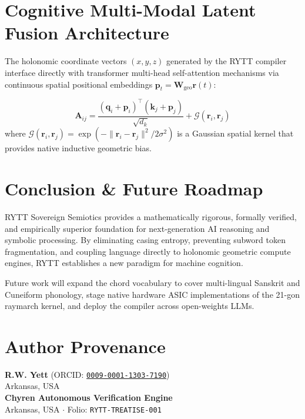 \documentclass[11pt,oneside,letterpaper]{article}
\theoremstyle{definition}
\begin{document}
\section{Cognitive Multi-Modal Latent Fusion Architecture}

The holonomic coordinate vectors $(x, y, z)$ generated by the RYTT compiler interface directly with transformer multi-head self-attention mechanisms via continuous spatial positional embeddings $\mathbf{p}_t = \mathbf{W}_{\text{geo}} \mathbf{r}(t)$:

\begin{equation}
\mathbf{A}_{ij} = \frac{(\mathbf{q}_i + \mathbf{p}_i)^\top (\mathbf{k}_j + \mathbf{p}_j)}{\sqrt{d_k}} + \mathcal{G}(\mathbf{r}_i, \mathbf{r}_j)
\end{equation}
where $\mathcal{G}(\mathbf{r}_i, \mathbf{r}_j) = \exp(-\|\mathbf{r}_i - \mathbf{r}_j\|^2 / 2\sigma^2)$ is a Gaussian spatial kernel that provides native inductive geometric bias.

\section{Conclusion \& Future Roadmap}

RYTT Sovereign Semiotics provides a mathematically rigorous, formally verified, and empirically superior foundation for next-generation AI reasoning and symbolic processing. By eliminating casing entropy, preventing subword token fragmentation, and coupling language directly to holonomic geometric compute engines, RYTT establishes a new paradigm for machine cognition.

Future work will expand the chord vocabulary to cover multi-lingual Sanskrit and Cuneiform phonology, stage native hardware ASIC implementations of the 21-gon raymarch kernel, and deploy the compiler across open-weights LLMs.

\section*{Author Provenance}
\noindent\textbf{R.W. Yett} (ORCID: \href{https://orcid.org/0009-0001-1303-7190}{\texttt{0009-0001-1303-7190}})\\
Arkansas, USA\\
\textbf{Chyren Autonomous Verification Engine}\\
Arkansas, USA $\cdot$ Folio: \texttt{RYTT-TREATISE-001}
\end{document}
